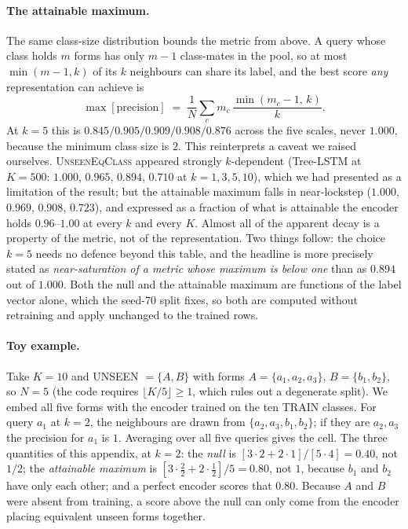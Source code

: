 \paragraph{The attainable maximum.} The same class-size distribution bounds the metric from above. A query whose class holds $m$ forms has only $m{-}1$ class-mates in the pool, so at most $\min(m{-}1,k)$ of its $k$ neighbours can share its label, and the best score \emph{any} representation can achieve is
\[
\max[\text{precision}] \;=\; \frac{1}{N}\sum_c m_c\,\frac{\min(m_c-1,\,k)}{k}.
\]
At $k{=}5$ this is $0.845/0.905/0.909/0.908/0.876$ across the five scales, never $1.000$, because the minimum class size is $2$. This reinterprets a caveat we raised ourselves. \textsc{UnseenEqClass} appeared strongly $k$-dependent (Tree-LSTM at $K{=}500$: $1.000$, $0.965$, $0.894$, $0.710$ at $k{=}1,3,5,10$), which we had presented as a limitation of the result; but the attainable maximum falls in near-lockstep ($1.000$, $0.969$, $0.908$, $0.723$), and expressed as a fraction of what is attainable the encoder holds $0.96$--$1.00$ at every $k$ and every $K$. Almost all of the apparent decay is a property of the metric, not of the representation. Two things follow: the choice $k{=}5$ needs no defence beyond this table, and the headline is more precisely stated as \emph{near-saturation of a metric whose maximum is below one} than as $0.894$ out of $1.000$. Both the null and the attainable maximum are functions of the label vector alone, which the seed-70 split fixes, so both are computed without retraining and apply unchanged to the trained rows.

\paragraph{Toy example.} Take $K{=}10$ and UNSEEN $=\{A,B\}$ with forms $A{=}\{a_1,a_2,a_3\}$, $B{=}\{b_1,b_2\}$, so $N{=}5$ (the code requires $\lfloor K/5\rfloor\!\geq\!1$, which rules out a degenerate split). We embed all five forms with the encoder trained on the ten TRAIN classes. For query $a_1$ at $k{=}2$, the neighbours are drawn from $\{a_2,a_3,b_1,b_2\}$; if they are $a_2,a_3$ the precision for $a_1$ is $1$. Averaging over all five queries gives the cell. The three quantities of this appendix, at $k{=}2$: the \emph{null} is $[3{\cdot}2 + 2{\cdot}1]/[5{\cdot}4] = 0.40$, not $1/2$; the \emph{attainable maximum} is $[3{\cdot}\tfrac{2}{2} + 2{\cdot}\tfrac{1}{2}]/5 = 0.80$, not $1$, because $b_1$ and $b_2$ have only each other; and a perfect encoder scores that $0.80$. Because $A$ and $B$ were absent from training, a score above the null can only come from the encoder placing equivalent unseen forms together.

